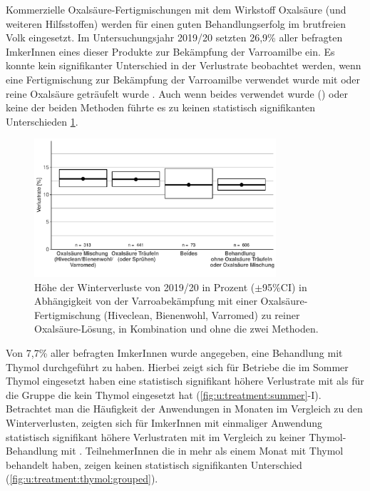 Kommerzielle Oxalsäure-Fertigmischungen mit dem Wirkstoff Oxalsäure (und weiteren Hilfsstoffen) werden für einen guten Behandlungserfolg im brutfreien Volk eingesetzt. Im Untersuchungsjahr 2019/20 setzten 26,9\% aller befragten ImkerInnen eines dieser Produkte zur Bekämpfung der Varroamilbe ein. Es konnte kein signifikanter Unterschied in der Verlustrate beobachtet werden, wenn eine Fertigmischung zur Bekämpfung der Varroamilbe verwendet wurde mit  oder reine Oxalsäure geträufelt wurde .
Auch wenn beides verwendet wurde () oder keine der beiden Methoden  führte es zu keinen statistisch signifikanten Unterschieden \cref{fig:u:treatment:oxalmix}.

\begin{figure}[H]
  \centering
  \includegraphics[keepaspectratio,width=0.8\textwidth]{project-U-wintersterblichkeit/figures/plot_treatment_oxalmix}
  \caption{Höhe der Winterverluste von 2019/20 in Prozent ($\pm$95\%CI) in Abhängigkeit von der Varroabekämpfung mit einer Oxalsäure-Fertigmischung (Hiveclean, Bienenwohl, Varromed) zu reiner Oxalsäure-Lösung, in Kombination und ohne die zwei Methoden.}
  \label{fig:u:treatment:oxalmix}
\end{figure}


Von 7,7\% aller befragten ImkerInnen wurde angegeben, eine Behandlung mit Thymol durchgeführt zu haben. Hierbei zeigt sich für Betriebe die im Sommer Thymol eingesetzt haben eine statistisch signifikant höhere Verlustrate mit  als für die Gruppe die kein Thymol eingesetzt hat  (\cref{fig:u:treatment:summer}-I).
\newline
Betrachtet man die Häufigkeit der Anwendungen in Monaten im Vergleich zu den Winterverlusten, zeigten sich für ImkerInnen mit einmaliger Anwendung statistisch signifikant höhere Verlustraten mit  im Vergleich zu keiner Thymol-Behandlung mit . TeilnehmerInnen die in mehr als einem Monat mit Thymol behandelt haben, zeigen keinen statistisch signifikanten Unterschied  (\cref{fig:u:treatment:thymol:grouped}).

